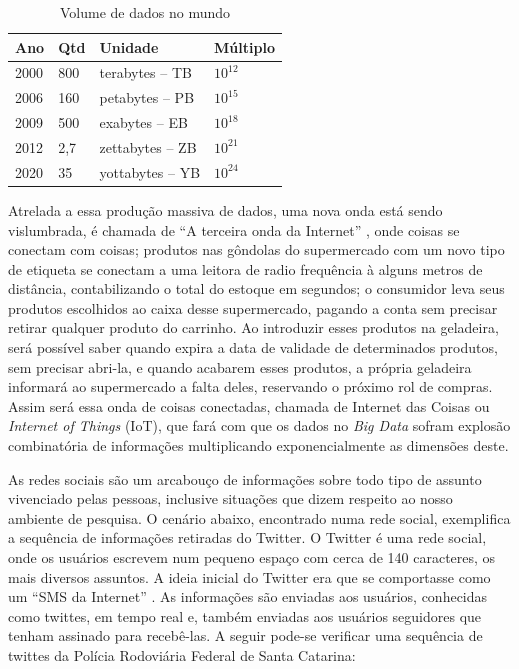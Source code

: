 \documentclass[conference,compsoc]{IEEEtran}
\begin{document}

\begin{table}[!ht]
\scriptsize
\centering
\caption{Volume de dados no mundo}
\begin{tabular}{|p{6mm}|p{5mm}|p{16mm}|p{8mm}|}
\hline
Ano & Qtd & Unidade & Múltiplo \\
\hline
2000 & 800 & terabytes – TB & $10^{12}$ \\ \hline

2006 & 160 & petabytes – PB & $10^{15}$ \\ \hline

2009 & 500 & exabytes – EB & $10^{18}$ \\ \hline

2012 & 2,7 & zettabytes – ZB & $10^{21}$ \\ \hline

2020 & 35 & yottabytes – YB & $10^{24}$ \\ \hline

\end{tabular}
\end{table}

Atrelada a essa produção massiva de dados, uma nova onda está sendo vislumbrada, é chamada de ``A terceira onda da Internet''
, onde coisas se conectam com coisas; produtos nas gôndolas do supermercado com um novo tipo de etiqueta se conectam a uma 
leitora de radio frequência à alguns metros de distância, contabilizando o total do estoque em segundos; o consumidor leva 
seus produtos escolhidos ao caixa desse supermercado, pagando a conta sem precisar retirar qualquer produto do carrinho. 
Ao introduzir esses produtos na geladeira, será possível saber quando expira a data de validade de determinados produtos, sem 
precisar abri-la, e quando acabarem esses produtos, a própria geladeira informará ao supermercado a falta deles, reservando 
o próximo rol de compras. Assim será essa onda de coisas conectadas, chamada de Internet das Coisas ou \textit{Internet of Things} (IoT),
que fará com que os dados no \textit{Big Data} sofram explosão combinatória de informações multiplicando exponencialmente as dimensões deste.


As redes sociais são um arcabouço de informações sobre todo tipo de assunto vivenciado pelas pessoas, inclusive situações que dizem respeito ao nosso ambiente de pesquisa.
O cenário abaixo, encontrado numa rede social, exemplifica a sequência de informações retiradas do Twitter.
O Twitter é uma rede social, onde os usuários escrevem num pequeno espaço com cerca de 140 caracteres, os mais diversos assuntos. A ideia inicial do Twitter era que se comportasse como um ``SMS da Internet'' \cite{Twitter2015}. As informações são enviadas aos usuários, conhecidas como twittes, em tempo real e, também enviadas aos usuários seguidores que tenham assinado para recebê-las. A seguir pode-se verificar uma sequência de twittes da Polícia Rodoviária Federal de Santa Catarina:
\end{document}
